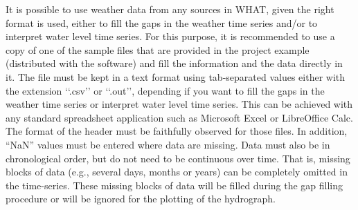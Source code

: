 \documentclass[WHATMANUAL.tex]{subfiles}
\begin{document}
It is possible to use weather data from any sources in WHAT, given the right format is used, either to fill the gaps in the weather time series and/or to interpret water level time series. For this purpose, it is recommended to use a copy of one of the sample files that are provided in the project example (distributed with the software) and fill the information and the data directly in it. The file must be kept in a text format using tab-separated values either with the extension ‘‘.csv’’ or ‘‘.out’’, depending if you want to fill the gaps in the weather time series or  interpret water level time series. This can be achieved with any standard spreadsheet application such as Microsoft Excel or LibreOffice Calc. The format of the header must be faithfully observed for those files. In addition, ``NaN'' values must be entered where data are missing. Data must also be in chronological order, but do not need to be continuous over time. That is, missing blocks of data (e.g., several days, months or years) can be completely omitted in the time-series. These missing blocks of data will be filled during the gap filling procedure or will be ignored for the plotting of the hydrograph.
\end{document}
